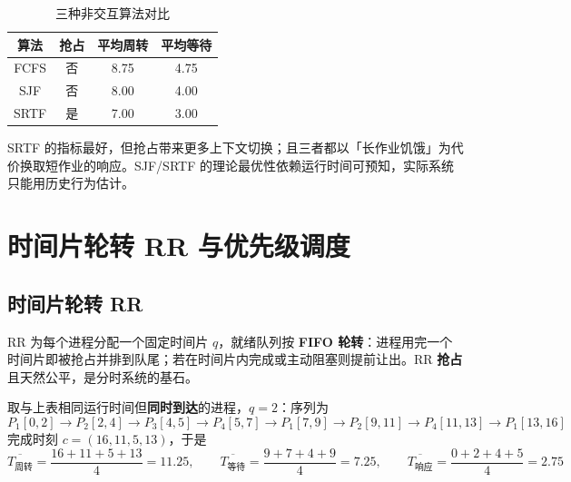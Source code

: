 \begin{table}[H]
\centering
\caption{三种非交互算法对比}
\begin{tabulary}{\textwidth}{CCCC}
\toprule
算法 & 抢占 & 平均周转 & 平均等待 \\
\midrule
FCFS & 否 & 8.75 & 4.75 \\
SJF  & 否 & 8.00 & 4.00 \\
SRTF & 是 & 7.00 & 3.00 \\
\bottomrule
\end{tabulary}
\end{table}

\noindent SRTF 的指标最好，但抢占带来更多上下文切换；且三者都以「长作业饥饿」为代价换取短作业的响应。SJF/SRTF 的理论最优性依赖运行时间可预知，实际系统只能用历史行为估计。

\section{时间片轮转 RR 与优先级调度}

\subsection{时间片轮转 RR}

RR 为每个进程分配一个固定时间片 $q$，就绪队列按 \textbf{FIFO 轮转}：进程用完一个时间片即被抢占并排到队尾；若在时间片内完成或主动阻塞则提前让出。RR \textbf{抢占}且天然公平，是分时系统的基石。

取与上表相同运行时间但\textbf{同时到达}的进程，$q=2$：序列为
\[
P_1[0,2] \to P_2[2,4] \to P_3[4,5] \to P_4[5,7] \to P_1[7,9] \to P_2[9,11] \to P_4[11,13] \to P_1[13,16]
\]
完成时刻 $c=(16,11,5,13)$，于是
\begin{equation}
    \overline{T_{\text{周转}}} = \frac{16+11+5+13}{4} = 11.25,\qquad
    \overline{T_{\text{等待}}} = \frac{9+7+4+9}{4} = 7.25,\qquad
    \overline{T_{\text{响应}}} = \frac{0+2+4+5}{4} = 2.75
\end{equation}

